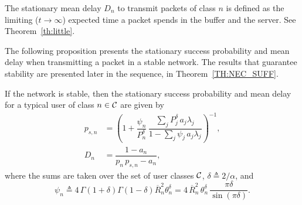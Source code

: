 The stationary mean delay $D_n$ to transmit packets of class $n$ is defined as the limiting ($t\to\infty$) expected time a packet spends in the buffer and the server.
%
See Theorem~\ref{th:little}.

%

%
The following proposition presents the stationary success probability and mean delay when transmitting a packet in a stable network. The results that guarantee stability are presented later in the sequence, in Theorem~\ref{TH:NEC_SUFF}.

\begin{proposition} \label{prop:psk}
	If the network is stable, then the stationary success probability and mean delay for a typical user of class $n \in \cal{C}$ are given by
	\begin{align}
    	p_{s,n} &= \left( 1 + \dfrac{\psi_n}{P_n^\delta}\, 
        \dfrac{\sum_j P_j^\delta\,a_j\lambda_j}
        {1 - \sum_j \psi_j\,a_j\lambda_j} \right)^{-1},\label{eq:psn}\\ 
        D_n &= \dfrac{1 - a_n}{p_n\,p_{s,n} - a_n},	\label{eq:Dn}
    \end{align}
    where the sums are taken over the set of user classes $\cal{C}$, ${\delta \triangleq 2/\alpha}$, and 
    \begin{equation}\label{eq:DefPhi}
        \psi_n
            \triangleq 4\,\Gamma(1+\delta) \Gamma(1-\delta) \overline{R}_n^2 \theta_n^\delta
            = 4\,\overline{R}_n^2\,\theta_n^{\delta}\, \frac{\pi\delta}{\sin(\pi \delta)}.
    \end{equation}
\end{proposition}

